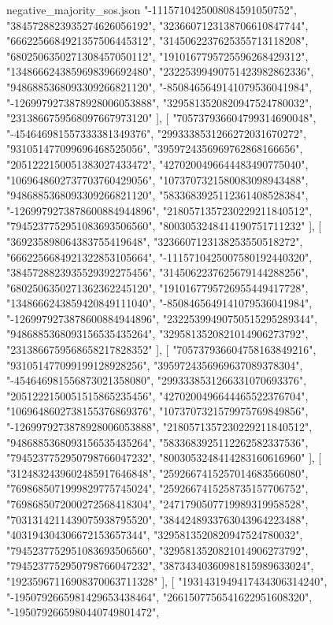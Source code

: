 \begin{filecontents*}[overwrite]{negative_majority_sos.json}
    "-1115710425008084591050752",
    "3845728823935274626056192",
    "3236607123138706610847744",
    "6662256684921357506445312",
    "3145062237625355713118208",
    "6802506350271308457050112",
    "1910167795725596268429312",
    "1348666243859698396692480",
    "23225399490751423982862336",
    "9486885368093309266821120",
    "-8508465649141079536041984",
    "-1269979273878928006053888",
    "3295813520820947524780032",
    "2313866759568097667973120"
   ],
   [
    "705737936604799314690048",
    "-454646981557333381349376",
    "2993338531266272031670272",
    "931051477099696468525056",
    "3959724356969762868166656",
    "2051222150051383027433472",
    "4270200496644483490775040",
    "1069648602737703760429056",
    "1073707321580083098943488",
    "9486885368093309266821120",
    "5833683925112361408528384",
    "-1269979273878600884944896",
    "2180571357230229211840512",
    "7945237752951083693506560",
    "8003053248414190751711232"
   ],
   [
    "369235898064383755419648",
    "3236607123138253550518272",
    "6662256684921322853105664",
    "-1115710425007580192440320",
    "3845728823935529392275456",
    "3145062237625679144288256",
    "6802506350271362362245120",
    "1910167795726955449417728",
    "1348666243859420849111040",
    "-8508465649141079536041984",
    "-1269979273878600884944896",
    "23225399490750515295289344",
    "9486885368093156535435264",
    "3295813520821014906273792",
    "2313866759568658217828352"
   ],
   [
    "705737936604758163849216",
    "931051477099199128928256",
    "3959724356969637089378304",
    "-454646981556873021358080",
    "2993338531266331070693376",
    "2051222150051515865235456",
    "4270200496644465522376704",
    "1069648602738155376869376",
    "1073707321579975769849856",
    "-1269979273878928006053888",
    "2180571357230229211840512",
    "9486885368093156535435264",
    "5833683925112262582337536",
    "7945237752950798766047232",
    "8003053248414283160616960"
   ],
   [
    "3124832439602485917646848",
    "2592667415257014683566080",
    "7698685071999829775745024",
    "2592667415258735157706752",
    "7698685072000272568418304",
    "2471790507719989319958528",
    "7031314211439075938795520",
    "3844248933763043964223488",
    "403194304306672153657344",
    "3295813520820947524780032",
    "7945237752951083693506560",
    "3295813520821014906273792",
    "7945237752950798766047232",
    "38734340360981815989633024",
    "19235967116908370063711328"
   ],
   [
    "1931431949417434306314240",
    "-1950792665981429653438464",
    "2661507756541622951608320",
    "-1950792665980440749801472",

\end{filecontents*}
